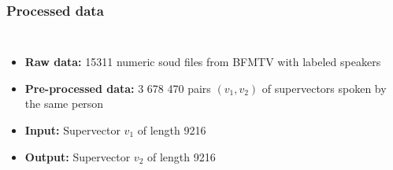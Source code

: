 \documentclass[11pt,english]{beamer}
\begin{document}
\begin{frame}
  \frametitle{Processed data}

  \begin{columns}
    \begin{itemize}
\setlength\itemsep{2em}
    \item \textbf{Raw data:} 15311 numeric soud files from BFMTV with labeled speakers
    \item \textbf{Pre-processed data:} 3 678 470 pairs $(v_1,v_2)$ of supervectors
      spoken by the same person
    \item \textbf{Input:} Supervector $v_1$ of length 9216
    \item \textbf{Output:} Supervector $v_2$ of length 9216

    \end{itemize}

  \end{columns}
  
\end{frame}
\end{document}
